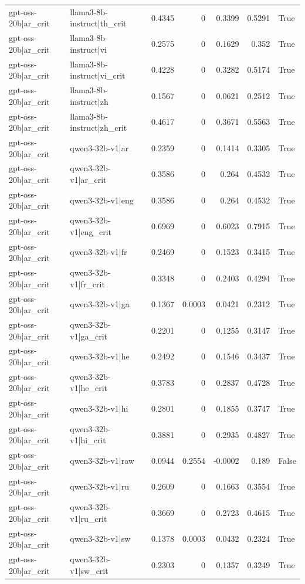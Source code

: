 \begin{table}
\begin{tabular}{l l r r r r l}
gpt-oss-20b|ar_crit & llama3-8b-instruct|th_crit & 0.4345 & 0 & 0.3399 & 0.5291 & True \\
gpt-oss-20b|ar_crit & llama3-8b-instruct|vi & 0.2575 & 0 & 0.1629 & 0.352 & True \\
gpt-oss-20b|ar_crit & llama3-8b-instruct|vi_crit & 0.4228 & 0 & 0.3282 & 0.5174 & True \\
gpt-oss-20b|ar_crit & llama3-8b-instruct|zh & 0.1567 & 0 & 0.0621 & 0.2512 & True \\
gpt-oss-20b|ar_crit & llama3-8b-instruct|zh_crit & 0.4617 & 0 & 0.3671 & 0.5563 & True \\
gpt-oss-20b|ar_crit & qwen3-32b-v1|ar & 0.2359 & 0 & 0.1414 & 0.3305 & True \\
gpt-oss-20b|ar_crit & qwen3-32b-v1|ar_crit & 0.3586 & 0 & 0.264 & 0.4532 & True \\
gpt-oss-20b|ar_crit & qwen3-32b-v1|eng & 0.3586 & 0 & 0.264 & 0.4532 & True \\
gpt-oss-20b|ar_crit & qwen3-32b-v1|eng_crit & 0.6969 & 0 & 0.6023 & 0.7915 & True \\
gpt-oss-20b|ar_crit & qwen3-32b-v1|fr & 0.2469 & 0 & 0.1523 & 0.3415 & True \\
gpt-oss-20b|ar_crit & qwen3-32b-v1|fr_crit & 0.3348 & 0 & 0.2403 & 0.4294 & True \\
gpt-oss-20b|ar_crit & qwen3-32b-v1|ga & 0.1367 & 0.0003 & 0.0421 & 0.2312 & True \\
gpt-oss-20b|ar_crit & qwen3-32b-v1|ga_crit & 0.2201 & 0 & 0.1255 & 0.3147 & True \\
gpt-oss-20b|ar_crit & qwen3-32b-v1|he & 0.2492 & 0 & 0.1546 & 0.3437 & True \\
gpt-oss-20b|ar_crit & qwen3-32b-v1|he_crit & 0.3783 & 0 & 0.2837 & 0.4728 & True \\
gpt-oss-20b|ar_crit & qwen3-32b-v1|hi & 0.2801 & 0 & 0.1855 & 0.3747 & True \\
gpt-oss-20b|ar_crit & qwen3-32b-v1|hi_crit & 0.3881 & 0 & 0.2935 & 0.4827 & True \\
gpt-oss-20b|ar_crit & qwen3-32b-v1|raw & 0.0944 & 0.2554 & -0.0002 & 0.189 & False \\
gpt-oss-20b|ar_crit & qwen3-32b-v1|ru & 0.2609 & 0 & 0.1663 & 0.3554 & True \\
gpt-oss-20b|ar_crit & qwen3-32b-v1|ru_crit & 0.3669 & 0 & 0.2723 & 0.4615 & True \\
gpt-oss-20b|ar_crit & qwen3-32b-v1|sw & 0.1378 & 0.0003 & 0.0432 & 0.2324 & True \\
gpt-oss-20b|ar_crit & qwen3-32b-v1|sw_crit & 0.2303 & 0 & 0.1357 & 0.3249 & True \\

\end{tabular}
\end{table}
